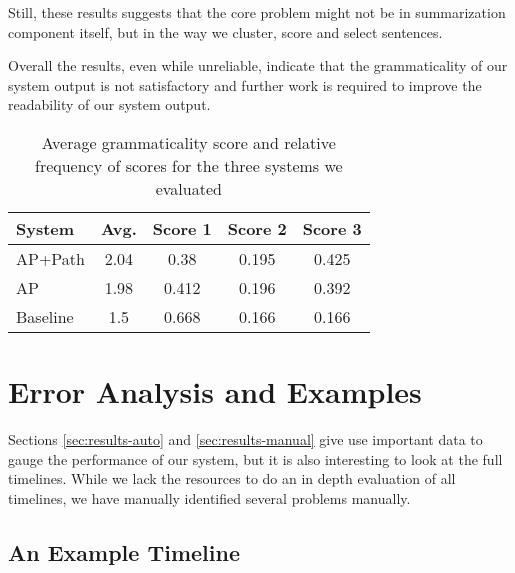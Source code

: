 \documentclass[a4paper,BCOR=10mm]{report}
\numberwithin{lemma}{chapter}
\numberwithin{definition}{chapter}
\begin{document}
Still, these results suggests that the core problem might not be in summarization component itself, but in the way we cluster, score and select sentences.

Overall the results, even while unreliable, indicate that the grammaticality of our system output is not satisfactory and further work is required to improve the readability of our system output.

\begin{table}

\centering\begin{tabular}{|l|c|ccc|}
\hline
\textbf{System} & \textbf{Avg.} & \textbf{Score 1} & \textbf{Score 2} & \textbf{Score 3} \\\hline
AP+Path &  2.04 & 0.38 & 0.195 & 0.425 \\
AP & 1.98 & 0.412 & 0.196 & 0.392 \\
Baseline & 1.5 & 0.668 & 0.166 & 0.166 \\\hline
\end{tabular}


\caption{Average grammaticality score and relative frequency of scores for the three systems we evaluated}
\label{tab:results-manual}
\end{table}

\chapter{Error Analysis and Examples}  \label{sec:errors}

Sections \ref{sec:results-auto} and \ref{sec:results-manual} give use important data to gauge the performance of our system, but it is also interesting to look at the full timelines.
While we lack the resources to do an in depth evaluation of all timelines, we have manually identified several problems manually.

\section{An Example Timeline}
\end{document}
